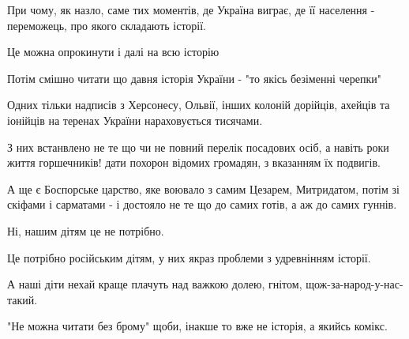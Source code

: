 При чому, як назло, саме тих моментів, де Україна виграє, де її населення - переможець, про якого складають історії. 

Це можна опрокинути і далі на всю історію 

Потім смішно читати що давня історія України - "то якісь безіменні черепки"

Одних тільки надписів з Херсонесу, Ольвії, інших колоній дорійців, ахейців та
іонійців на теренах України нараховується тисячами. 

З них встанвлено не те що чи не повний перелік посадових осіб, а навіть роки
життя горшечників! дати похорон відомих громадян, з вказанням їх подвигів. 

А ще є Боспорське царство, яке воювало з самим Цезарем, Митридатом, потім зі
скіфами і сарматами - і достояло не те що до самих готів, а аж до самих гуннів. 

Ні, нашим дітям це не потрібно. 

Це потрібно російським дітям, у них якраз проблеми з удревнінням історії. 

А наші діти нехай краще плачуть над важкою долею, гнітом, щож-за-народ-у-нас-такий. 

"Не можна читати без брому" щоби, інакше то вже не історія, а якийсь комікс.
